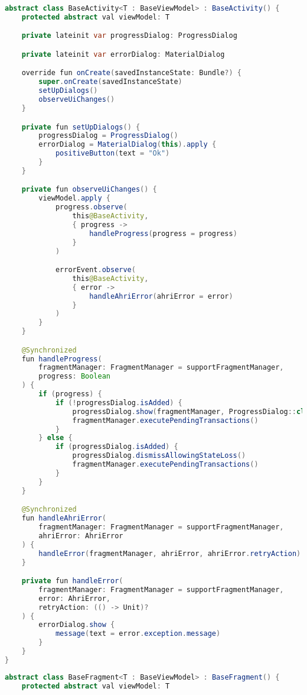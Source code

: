 \begin{asection}

\setlength{\parindent}{0ex}
\begin{lstlisting}[language=Java,label={lst:add:a_1}, caption={BaseActivity}]
abstract class BaseActivity<T : BaseViewModel> : BaseActivity() {
    protected abstract val viewModel: T

    private lateinit var progressDialog: ProgressDialog

    private lateinit var errorDialog: MaterialDialog

    override fun onCreate(savedInstanceState: Bundle?) {
        super.onCreate(savedInstanceState)
        setUpDialogs()
        observeUiChanges()
    }

    private fun setUpDialogs() {
        progressDialog = ProgressDialog()
        errorDialog = MaterialDialog(this).apply {
            positiveButton(text = "Ok")
        }
    }

    private fun observeUiChanges() {
        viewModel.apply {
            progress.observe(
                this@BaseActivity,
                { progress ->
                    handleProgress(progress = progress)
                }
            )

            errorEvent.observe(
                this@BaseActivity,
                { error ->
                    handleAhriError(ahriError = error)
                }
            )
        }
    }

    @Synchronized
    fun handleProgress(
        fragmentManager: FragmentManager = supportFragmentManager,
        progress: Boolean
    ) {
        if (progress) {
            if (!progressDialog.isAdded) {
                progressDialog.show(fragmentManager, ProgressDialog::class.java.canonicalName)
                fragmentManager.executePendingTransactions()
            }
        } else {
            if (progressDialog.isAdded) {
                progressDialog.dismissAllowingStateLoss()
                fragmentManager.executePendingTransactions()
            }
        }
    }

    @Synchronized
    fun handleAhriError(
        fragmentManager: FragmentManager = supportFragmentManager,
        ahriError: AhriError
    ) {
        handleError(fragmentManager, ahriError, ahriError.retryAction)
    }

    private fun handleError(
        fragmentManager: FragmentManager = supportFragmentManager,
        error: AhriError,
        retryAction: (() -> Unit)?
    ) {
        errorDialog.show {
            message(text = error.exception.message)
        }
    }
}
\end{lstlisting}
\hfill \break
\begin{lstlisting}[language=Java,label={lst:add:a_2}, caption={BaseFragment}]
abstract class BaseFragment<T : BaseViewModel> : BaseFragment() {
    protected abstract val viewModel: T


\end{lstlisting}
\end{asection}
